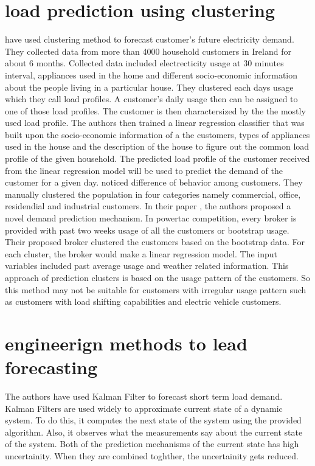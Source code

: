 \section {load prediction using clustering}
\cite{mcloughlin2015clustering} have used clustering method to forecast customer's future electricity demand. They collected data from more than 4000 household customers in Ireland for about 6 months. Collected data included electrecticity usage at 30 minutes interval, appliances used in the home and different socio-economic information about the people living in a particular house. They clustered each days usage which they call load profiles. A customer's daily usage then can be assigned to one of those load profiles. The customer is then charactersized by the the mostly used load profile. The authors then trained a linear regression classifier that was built upon the socio-economic information of a the customers, types of appliances used in the house and the description of the house to figure out the common load profile of the given household. The predicted load profile of the customer received from the linear regression model will be used to predict the demand of the customer for a given day.\cite{cho1995customer} noticed difference of behavior among customers. They manually clustered the population in four categories namely commercial, office, residendial and industrial customers. In their paper \cite{wang2015gongbroker}, the authors proposed a novel demand prediction mechanism. In powertac competition, every broker is provided with past two weeks usage of all the customers or bootstrap usage. Their proposed broker clustered the customers based on the bootstrap data. For each cluster, the broker would make a linear regression model. The input variables included past average usage and weather related information. This approach of prediction clusters is based on the usage pattern of the customers. So this method may not be suitable for customers with irregular usage pattern such as customers with load shifting capabilities and electric vehicle customers.

\section{engineerign methods to lead forecasting}
The authors \cite{al2004short} have used Kalman Filter to forecast short term load demand. Kalman Filters are used widely to approximate current state of a dynamic system. To do this, it computes the next state of the system using the provided algorithm. Also, it observes what the measurements say about the current state of the system. Both of the prediction mechanisms of the current state has high uncertainity. When they are combined toghther, the uncertainity gets reduced. 

